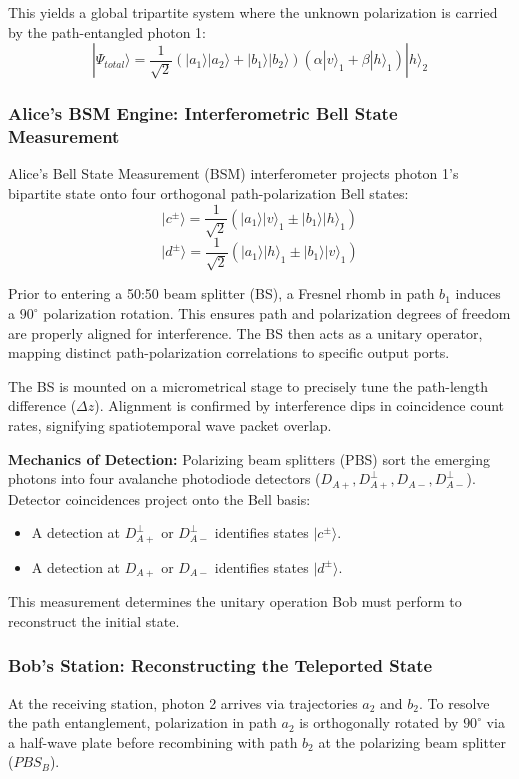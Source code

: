 \documentclass[aps,prd,preprint,floats,epsf,superscriptaddress,nofootinbib]{revtex4}
\begin{document}
This yields a global tripartite system where the unknown polarization is carried by the path-entangled photon 1:
$$|\Psi_{total}\rangle=\frac{1}{\sqrt{2}}(|a_1\rangle|a_2\rangle+|b_1\rangle|b_2\rangle)(\alpha|v\rangle_1+\beta|h\rangle_1)|h\rangle_2$$


\subsubsection{Alice's BSM Engine: Interferometric Bell State Measurement}
Alice's Bell State Measurement (BSM) interferometer projects photon 1's bipartite state onto four orthogonal path-polarization Bell states:
$$|c^\pm\rangle=\frac{1}{\sqrt{2}}(|a_1\rangle|v\rangle_1\pm|b_1\rangle|h\rangle_1)$$
$$|d^\pm\rangle=\frac{1}{\sqrt{2}}(|a_1\rangle|h\rangle_1\pm|b_1\rangle|v\rangle_1)$$

Prior to entering a 50:50 beam splitter (BS), a Fresnel rhomb in path $b_1$ induces a $90^\circ$ polarization rotation. This ensures path and polarization degrees of freedom are properly aligned for interference. The BS then acts as a unitary operator, mapping distinct path-polarization correlations to specific output ports. 

The BS is mounted on a micrometrical stage to precisely tune the path-length difference ($\Delta z$). Alignment is confirmed by interference dips in coincidence count rates, signifying spatiotemporal wave packet overlap.

\textbf{Mechanics of Detection:} Polarizing beam splitters (PBS) sort the emerging photons into four avalanche photodiode detectors ($D_{A+}, D_{A+}^\perp, D_{A-}, D_{A-}^\perp$). Detector coincidences project onto the Bell basis:
\begin{itemize}
    \item A detection at $D_{A+}^\perp$ or $D_{A-}^\perp$ identifies states $|c^\pm\rangle$.
    \item A detection at $D_{A+}$ or $D_{A-}$ identifies states $|d^\pm\rangle$.
\end{itemize}
This measurement determines the unitary operation Bob must perform to reconstruct the initial state.


\subsubsection{Bob's Station: Reconstructing the Teleported State}
At the receiving station, photon 2 arrives via trajectories $a_2$ and $b_2$. To resolve the path entanglement, polarization in path $a_2$ is orthogonally rotated by $90^\circ$ via a half-wave plate before recombining with path $b_2$ at the polarizing beam splitter ($PBS_B$).
\end{document}
